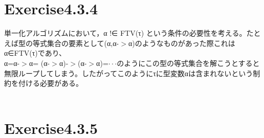 \documentclass[a4paper,11pt,oneside,openany]{jsarticle}
\begin{document}
\section{Exercise4.3.4}
単一化アルゴリズムにおいて，α !∈ FTV(τ) という条件の必要性を考える。たとえば型の等式集合の要素として(α,α-$>$α)のようなものがあった際これはα∈FTV(τ)であり、\\α=α-$>$α= (α-$>$α)-$>$(α-$>$α)=$\cdot\cdot\cdot$のようにこの型の等式集合を解こうとすると無限ループしてしまう。したがってこのようにτに型変数αは含まれないという制約を付ける必要がある。
\\\\

\section{Exercise4.3.5}
\end{document}
